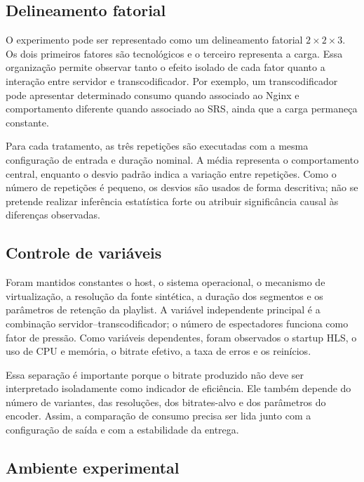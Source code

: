 \subsection{Delineamento fatorial}

O experimento pode ser representado como um delineamento fatorial $2\times2\times3$. Os dois primeiros fatores são tecnológicos e o terceiro representa a carga. Essa organização permite observar tanto o efeito isolado de cada fator quanto a interação entre servidor e transcodificador. Por exemplo, um transcodificador pode apresentar determinado consumo quando associado ao Nginx e comportamento diferente quando associado ao SRS, ainda que a carga permaneça constante.

Para cada tratamento, as três repetições são executadas com a mesma configuração de entrada e duração nominal. A média representa o comportamento central, enquanto o desvio padrão indica a variação entre repetições. Como o número de repetições é pequeno, os desvios são usados de forma descritiva; não se pretende realizar inferência estatística forte ou atribuir significância causal às diferenças observadas.

\subsection{Controle de variáveis}

Foram mantidos constantes o host, o sistema operacional, o mecanismo de virtualização, a resolução da fonte sintética, a duração dos segmentos e os parâmetros de retenção da playlist. A variável independente principal é a combinação servidor--transcodificador; o número de espectadores funciona como fator de pressão. Como variáveis dependentes, foram observados o startup HLS, o uso de CPU e memória, o bitrate efetivo, a taxa de erros e os reinícios.

Essa separação é importante porque o bitrate produzido não deve ser interpretado isoladamente como indicador de eficiência. Ele também depende do número de variantes, das resoluções, dos bitrates-alvo e dos parâmetros do encoder. Assim, a comparação de consumo precisa ser lida junto com a configuração de saída e com a estabilidade da entrega.

\subsection{Ambiente experimental}


